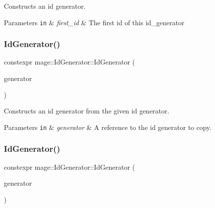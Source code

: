 Constructs an id generator.


\begin{DoxyParams}[1]{Parameters}
\mbox{\tt in}  & {\em first\+\_\+id} & The first id of this id\+\_\+generator \\
\hline
\end{DoxyParams}
\mbox{\label{classmage_1_1_id_generator_af9031d6e7bdec72d7d46c975d3ff2476}} 
\subsubsection{\texorpdfstring{Id\+Generator()}{IdGenerator()}\hspace{0.1cm}{\footnotesize\ttfamily [2/3]}}
{\footnotesize\ttfamily constexpr mage\+::\+Id\+Generator\+::\+Id\+Generator (\begin{DoxyParamCaption}\item[{const \mbox{\hyperlink{classmage_1_1_id_generator}{Id\+Generator}} \&}]{generator }\end{DoxyParamCaption})\hspace{0.3cm}{\ttfamily [delete]}}

Constructs an id generator from the given id generator.


\begin{DoxyParams}[1]{Parameters}
\mbox{\tt in}  & {\em generator} & A reference to the id generator to copy. \\
\hline
\end{DoxyParams}
\mbox{\label{classmage_1_1_id_generator_a1f1da4e89427aaad06adb665b95ca70a}} 
\subsubsection{\texorpdfstring{Id\+Generator()}{IdGenerator()}\hspace{0.1cm}{\footnotesize\ttfamily [3/3]}}
{\footnotesize\ttfamily constexpr mage\+::\+Id\+Generator\+::\+Id\+Generator (\begin{DoxyParamCaption}\item[{\mbox{\hyperlink{classmage_1_1_id_generator}{Id\+Generator}} \&\&}]{generator }\end{DoxyParamCaption})\hspace{0.3cm}{\ttfamily [delete]}}

